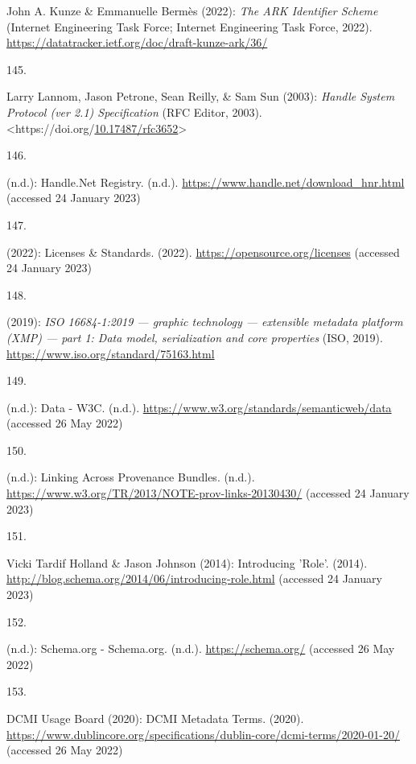 \begin{thebibliography}{9}
John A. Kunze \& Emmanuelle Bermès (2022): \emph{{The ARK Identifier
Scheme}} (Internet Engineering Task Force; Internet Engineering Task
Force, 2022). \url{https://datatracker.ietf.org/doc/draft-kunze-ark/36/}

\hypertarget{ref-rfc3652}{}
145.

Larry Lannom, Jason Petrone, Sean Reilly, \& Sam Sun (2003):
\emph{Handle {System Protocol} (ver 2.1) {Specification}} ({RFC Editor},
2003).
\textless https://doi.org/\href{https://doi.org/10.17487/rfc3652}{10.17487/rfc3652}\textgreater{}

\hypertarget{ref-HandleNetRegistry}{}
146.

(n.d.): Handle.{Net Registry}. (n.d.).
\url{https://www.handle.net/download_hnr.html} (accessed 24 January
2023)

\hypertarget{ref-LicensesStandardsOpen}{}
147.

(2022): Licenses \& {Standards}. (2022).
\url{https://opensource.org/licenses} (accessed 24 January 2023)

\hypertarget{ref-iso16684}{}
148.

(2019): \emph{{ISO} 16684-1:2019 --- graphic technology --- extensible
metadata platform (XMP) --- part 1: Data model, serialization and core
properties} ({ISO}, 2019). \url{https://www.iso.org/standard/75163.html}

\hypertarget{ref-DataW3C}{}
149.

(n.d.): Data - {W3C}. (n.d.).
\url{https://www.w3.org/standards/semanticweb/data} (accessed 26 May
2022)

\hypertarget{ref-w3-prov-links}{}
150.

(n.d.): Linking {Across Provenance Bundles}. (n.d.).
\url{https://www.w3.org/TR/2013/NOTE-prov-links-20130430/} (accessed 24
January 2023)

\hypertarget{ref-hollandIntroducingRole2014}{}
151.

Vicki Tardif Holland \& Jason Johnson (2014): Introducing '{Role}'.
(2014). \url{http://blog.schema.org/2014/06/introducing-role.html}
(accessed 24 January 2023)

\hypertarget{ref-SchemaOrg}{}
152.

(n.d.): Schema.org - {Schema}.org. (n.d.). \url{https://schema.org/}
(accessed 26 May 2022)

\hypertarget{ref-DCMIMetadataTerms}{}
153.

DCMI Usage Board (2020): {DCMI Metadata Terms}. (2020).
\url{https://www.dublincore.org/specifications/dublin-core/dcmi-terms/2020-01-20/}
(accessed 26 May 2022)


\end{thebibliography}
